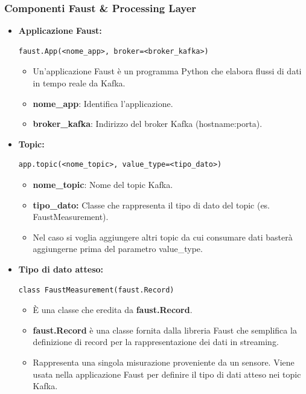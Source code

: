 \subsubsection{Componenti Faust \& Processing Layer}
\begin{itemize}
    \item \textbf{Applicazione Faust:}
    \begin{lstlisting}[style=code]
        faust.App(<nome_app>, broker=<broker_kafka>)
    \end{lstlisting} 
    \begin{itemize}
        \item Un'applicazione Faust è un programma Python che elabora flussi di dati in tempo reale da Kafka.
        \item \textbf{nome\_app}: Identifica l'applicazione.
        \item \textbf{broker\_kafka}: Indirizzo del broker Kafka (hostname:porta).
    \end{itemize}
    \item \textbf{Topic:}
    \begin{lstlisting}[style=code]
        app.topic(<nome_topic>, value_type=<tipo_dato>)
    \end{lstlisting}  
    \begin{itemize}
        \item \textbf{nome\_topic}: Nome del topic Kafka.
        \item \textbf{tipo\_dato:} Classe che rappresenta il tipo di dato del topic (es. FaustMeasurement).
        \item Nel caso si voglia aggiungere altri topic da cui consumare dati basterà aggiungerne prima del parametro value\_type.
    \end{itemize}
    \item \textbf{Tipo di dato atteso:}
     \begin{lstlisting}[style=code]
        class FaustMeasurement(faust.Record)
    \end{lstlisting}  
    \begin{itemize}
        \item È una classe che eredita da \textbf{faust.Record}.
        \item \textbf{faust.Record} è una classe fornita dalla libreria Faust che semplifica la definizione di record per la rappresentazione dei dati in streaming.
        \item Rappresenta una singola misurazione proveniente da un sensore. Viene usata nella applicazione Faust per definire il tipo di dati atteso nei topic Kafka.

\end{itemize}
\end{itemize}
